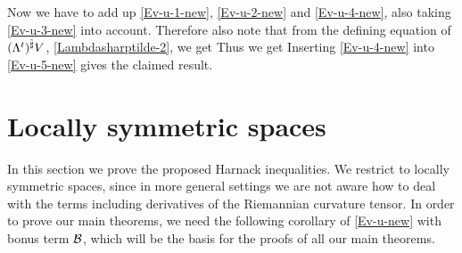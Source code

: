{Now we have to add up \eqref{Ev-u-1-new}, \eqref{Ev-u-2-new} and \eqref{Ev-u-4-new}, also taking \eqref{Ev-u-3-new} into account.
Therefore also note that from the defining equation of $(\Lambda^{t})^{\tilde\sharp}V$, \eqref{Lambdasharptilde-2}, we get
 Thus we get
Inserting \eqref{Ev-u-4-new} into \eqref{Ev-u-5-new} gives the claimed result.
}
\section{Locally symmetric spaces}
In this section we prove the proposed Harnack inequalities. We restrict to locally symmetric spaces, since in more general settings we are not aware how to deal with the terms including derivatives of the Riemannian curvature tensor. In order to prove our main theorems, we need the following corollary of \eqref{Ev-u-new} with bonus term $\mathcal{B}$, which will be the basis for the proofs of all our main theorems.

